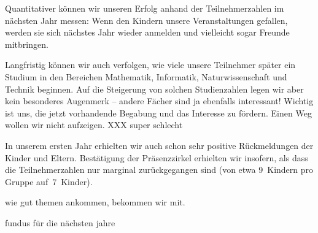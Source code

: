 \documentclass[12pt]{zettel}
\begin{document}
Quantitativer können wir unseren Erfolg anhand der Teilnehmerzahlen im nächsten
Jahr messen: Wenn den Kindern unsere Veranstaltungen gefallen, werden sie sich
nächstes Jahr wieder anmelden und vielleicht sogar Freunde mitbringen.

Langfristig können wir auch verfolgen, wie viele unsere Teilnehmer später ein
Studium in den Bereichen Mathematik, Informatik, Naturwissenschaft und Technik
beginnen. Auf die Steigerung von solchen Studienzahlen legen wir aber kein
besonderes Augenmerk -- andere Fächer sind ja ebenfalls interessant! Wichtig
ist uns, die jetzt vorhandende Begabung und das Interesse zu fördern. Einen Weg
wollen wir nicht aufzeigen. XXX super schlecht

In unserem ersten Jahr erhielten wir auch schon sehr positive Rückmeldungen der
Kinder und Eltern. Bestätigung der Präsenzzirkel erhielten wir insofern, als
dass die Teilnehmerzahlen nur marginal zurückgegangen sind (von etwa 9~Kindern
pro Gruppe auf~7~Kinder).

wie gut themen ankommen, bekommen wir mit.

fundus für die nächsten jahre
\end{document}
